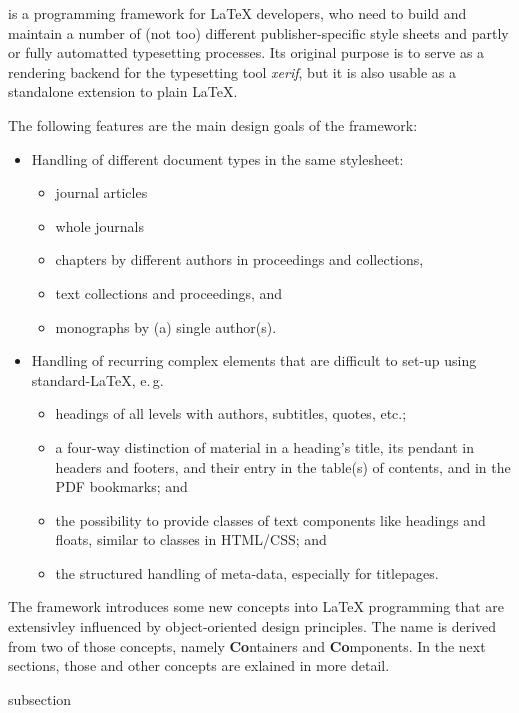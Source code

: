 {\CoCoTeX} is a programming framework for {\LaTeX} developers, who
need to build and maintain a number of (not too) different
publisher-specific style sheets and partly or fully automatted
typesetting processes. Its original purpose is to serve as a rendering
backend for the typesetting tool \textit{xerif}, but it is also usable
as a standalone extension to plain {\LaTeX}.

The following features are the main design goals of the {\CoCoTeX}
framework:
\begin{itemize}
\item Handling of different document types in the same stylesheet:
  \begin{itemize}
  \item journal articles
  \item whole journals
  \item chapters by different authors in proceedings and collections,
  \item text collections and proceedings, and
  \item monographs by (a) single author(s).
  \end{itemize}
\item Handling of recurring complex elements that are difficult to
  set-up using standard-\LaTeX, e.\,g.
  \begin{itemize}
  \item headings of all levels with authors, subtitles, quotes, etc.;
  \item a four-way distinction of material in a heading's title, its
    pendant in headers and footers, and their entry in the table(s) of
    contents, and in the PDF bookmarks; and
  \item the possibility to provide classes of text components like
    headings and floats, similar to classes in HTML/CSS; and
  \item the structured handling of meta-data, especially for
    titlepages.
  \end{itemize}
\end{itemize}

The framework introduces some new concepts into {\LaTeX} programming
that are extensivley influenced by object-oriented design principles.
The name {\CoCoTeX} is derived from two of those concepts, namely
\textbf{Co}ntainers and \textbf{Co}mponents. In the next sections,
those and other concepts are exlained in more detail.



\begin{heading}[label=sec:concepts]{subsection}
\end{heading}

